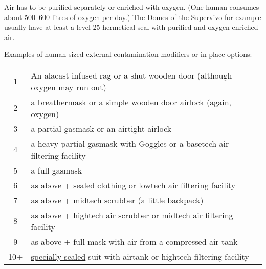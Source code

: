 Air has to be purified separately or enriched with oxygen.
(One human consumes about 500--600 litres of oxygen per day.)
The Domes of the Supervivo for
example usually have at least a level 25 hermetical seal with purified and oxygen enriched air.

Examples of human sized external contamination modifiers or in-place options:

\begin{tabular}{cl}
    1& An alacast infused rag or a shut wooden door (although oxygen may run out)\\
    2& a breathermask or a simple wooden door airlock (again, oxygen)\\
    3& a partial gasmask or an airtight airlock\\
    4& a heavy partial gasmask with Goggles or a basetech air filtering facility\\
    5& a full gasmask\\
    6& as above + sealed clothing or lowtech air filtering facility\\
    7& as above + midtech scrubber (a little backpack)\\
    8& as above + hightech air scrubber or midtech air filtering facility\\
    9& as above + full mask with air from a compressed air tank\\
    10+& \hyperref[subsec:seals]{specially sealed} suit with airtank or hightech filtering facility\\
\end{tabular}
